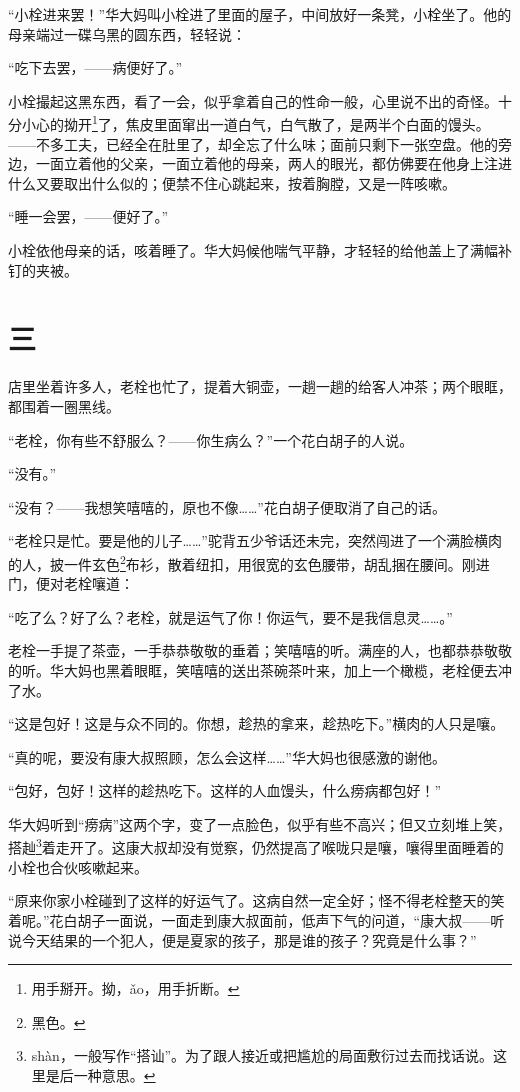 \documentclass[12pt,UTF8]{ctexbook}
\begin{document}
“小栓进来罢！”华大妈叫小栓进了里面的屋子，中间放好一条凳，小栓坐了。他的母亲端过一碟乌黑的圆东西，轻轻说：

“吃下去罢，——病便好了。”

小栓撮起这黑东西，看了一会，似乎拿着自己的性命一般，心里说不出的奇怪。十分小心的拗开\footnote{用手掰开。拗，ǎo，用手折断。}了，焦皮里面窜出一道白气，白气散了，是两半个白面的馒头。——不多工夫，已经全在肚里了，却全忘了什么味；面前只剩下一张空盘。他的旁边，一面立着他的父亲，一面立着他的母亲，两人的眼光，都仿佛要在他身上注进什么又要取出什么似的；便禁不住心跳起来，按着胸膛，又是一阵咳嗽。

“睡一会罢，——便好了。”

小栓依他母亲的话，咳着睡了。华大妈候他喘气平静，才轻轻的给他盖上了满幅补钉的夹被。

\chapter{三}

店里坐着许多人，老栓也忙了，提着大铜壶，一趟一趟的给客人冲茶；两个眼眶，都围着一圈黑线。

“老栓，你有些不舒服么？——你生病么？”一个花白胡子的人说。

“没有。”

“没有？——我想笑嘻嘻的，原也不像……”花白胡子便取消了自己的话。

“老栓只是忙。要是他的儿子……”驼背五少爷话还未完，突然闯进了一个满脸横肉的人，披一件玄色\footnote{黑色。}布衫，散着纽扣，用很宽的玄色腰带，胡乱捆在腰间。刚进门，便对老栓嚷道：

“吃了么？好了么？老栓，就是运气了你！你运气，要不是我信息灵……。”

老栓一手提了茶壶，一手恭恭敬敬的垂着；笑嘻嘻的听。满座的人，也都恭恭敬敬的听。华大妈也黑着眼眶，笑嘻嘻的送出茶碗茶叶来，加上一个橄榄，老栓便去冲了水。

“这是包好！这是与众不同的。你想，趁热的拿来，趁热吃下。”横肉的人只是嚷。

“真的呢，要没有康大叔照顾，怎么会这样……”华大妈也很感激的谢他。

“包好，包好！这样的趁热吃下。这样的人血馒头，什么痨病都包好！”

华大妈听到“痨病”这两个字，变了一点脸色，似乎有些不高兴；但又立刻堆上笑，搭赸\footnote{shàn，一般写作“搭讪”。为了跟人接近或把尴尬的局面敷衍过去而找话说。这里是后一种意思。}着走开了。这康大叔却没有觉察，仍然提高了喉咙只是嚷，嚷得里面睡着的小栓也合伙咳嗽起来。

“原来你家小栓碰到了这样的好运气了。这病自然一定全好；怪不得老栓整天的笑着呢。”花白胡子一面说，一面走到康大叔面前，低声下气的问道，“康大叔——听说今天结果的一个犯人，便是夏家的孩子，那是谁的孩子？究竟是什么事？”
\end{document}
